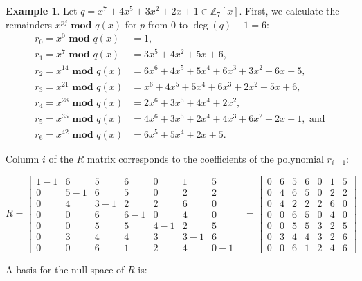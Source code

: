 \documentclass{article}
\theoremstyle{definition}
\newtheorem{exa}[thm]{Example}
\begin{document}
    \begin{exa}
    Let $q = x^7+4x^5+3x^2+2x+1 \in \mathbb{Z}_7[x]$. First, we calculate the remainders $x^{pj} \textbf{ mod } q(x)$ for $p$ from 0 to $\deg(q) - 1 = 6$:
    \begin{align*}
        r_0 = x^{0} \textbf{ mod } q(x) & = 1,\\
        r_1 = x^{7} \textbf{ mod } q(x) & = 3x^5 + 4x^2 + 5x + 6,\\
        r_2 = x^{14} \textbf{ mod } q(x) & = 6x^6 + 4x^5 + 5x^4 + 6x^3 + 3x^2 + 6x + 5, \\
        r_3 = x^{21} \textbf{ mod } q(x) & = x^6 + 4x^5 + 5x^4 + 6x^3 + 2x^2 + 5x + 6, \\
        r_4 = x^{28} \textbf{ mod } q(x) & =  2x^6 + 3x^5 + 4x^4 + 2x^2,\\
        r_5 = x^{35} \textbf{ mod } q(x) & = 4x^6 + 3x^5 + 2x^4 + 4x^3 + 6x^2 + 2x + 1, \text{ and}\\
        r_6 = x^{42} \textbf{ mod } q(x) & = 6x^5 + 5x^4 + 2x + 5.
    \end{align*}
    
    Column $i$ of the $R$ matrix corresponds to the coefficients of the polynomial $r_{i-1}$:
    
    
    \[R = \begin{bmatrix} 
    1-1 & 6 & 5 & 6 & 0 & 1 & 5 \\
    0& 5 - 1 & 6 & 5 & 0 & 2 & 2 \\
    0& 4 & 3 - 1& 2 & 2 & 6 & 0 \\
    0& 0 & 6 & 6 - 1 & 0 & 4 & 0 \\
    0& 0 & 5 & 5 & 4 - 1 & 2 & 5 \\
    0& 3 & 4 & 4 & 3 & 3 -1 & 6 \\
    0& 0 & 6 & 1 & 2 & 4 & 0 - 1
    \end{bmatrix} =
    \begin{bmatrix} 
    0& 6 & 5 & 6 & 0 & 1 & 5 \\
    0& 4 & 6 & 5 & 0 & 2 & 2 \\
    0& 4 & 2& 2 & 2 & 6 & 0 \\
    0& 0 & 6 & 5 & 0 & 4 & 0 \\
    0& 0 & 5 & 5 & 3 & 2 & 5 \\
    0& 3 & 4 & 4 & 3 & 2 & 6 \\
    0& 0 & 6 & 1 & 2 & 4 & 6 
    \end{bmatrix}
    \]
    
    A basis for the null space of $R$ is:
    

\end{exa}
\end{document}
